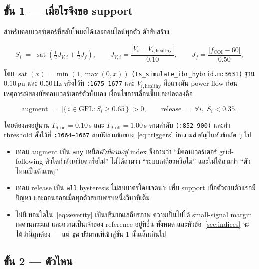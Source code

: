 \documentclass[12pt,a4paper]{article}
\theoremstyle{remark}
\newcommand{\pu}{\,\mathrm{pu}}
\newcommand{\Ssev}{S}
\newcommand{\code}[1]{\texttt{\small #1}}
\begin{document}
\subsection{ขั้น 1 --- เมื่อไรจึงขอ support}

สำหรับคอนเวอร์เตอร์ที่สลับโหมดได้และออนไลน์ทุกตัว ตัวขับสร้าง

\begin{equation}
\Ssev_i \;=\; \operatorname{sat}\!\left(\tfrac{1}{2}J_{V,i} + \tfrac{1}{2}J_f\right),
\qquad
J_{V,i} = \frac{|V_i - V_{i,\text{healthy}}|}{0.10},
\qquad
J_f = \frac{|f_{\mathrm{COI}} - 60|}{0.50},
\label{eq:severity}
\end{equation}

โดย $\operatorname{sat}(x) = \min(1,\max(0,x))$
\code{(ts\_simulate\_ibr\_hybrid.m:3631)} ฐาน $0.10\pu$ และ $0.50$\,Hz
ตรึงไว้ที่ \code{:1675--1677} และ $V_{i,\text{healthy}}$ คือแรงดัน power flow
ก่อนเหตุการณ์ของบัสคอนเวอร์เตอร์ตัวนั้นเอง เงื่อนไขการเลื่อนขึ้นและปลดลงคือ

\begin{equation}
\text{augment} \;=\; \bigl|\{\,i \in \text{GFL} : \Ssev_i \ge 0.65\,\}\bigr| > 0,
\qquad
\text{release} \;=\; \forall i,\; \Ssev_i < 0.35,
\label{eq:triggers}
\end{equation}

โดยต้องคงอยู่นาน $T_{d,\mathrm{on}} = 0.10$\,s และ $T_{d,\mathrm{off}} = 1.00$\,s
ตามลำดับ \code{(:852--900)} และค่า threshold ตั้งไว้ที่ \code{:1664--1667}
สมบัติสามข้อของ~\eqref{eq:triggers} มีความสำคัญในหัวข้อถัด ๆ ไป

\begin{itemize}
\item เทอม augment เป็น \code{any} เหนือ\emph{ตัวที่ตามอยู่} index จึงถามว่า
      ``มีคอนเวอร์เตอร์ grid-following ตัวใดกำลังเครียดหรือไม่'' ไม่ได้ถามว่า
      ``ระบบเสถียรหรือไม่'' และไม่ได้ถามว่า ``ตัวไหนเป็นต้นเหตุ''
\item เทอม release เป็น \code{all} hysteresis ไม่สมมาตรโดยเจตนา: เพิ่ม support
      เมื่อตัวตามตัวแรกมีปัญหา และถอนออกเมื่อทุกตัวสบายครบหนึ่งวินาทีเต็ม
\item ไม่มีเทอมใดใน~\eqref{eq:severity} เป็นปริมาณเสถียรภาพ ความเป็นไปได้
      small-signal margin เพดานกระแส และความเป็นเจ้าของ reference อยู่ที่อื่น
      ทั้งหมด และหัวข้อ~\ref{sec:indices} จะโต้ว่านี่ถูกต้อง --- แต่
      \emph{ชุด} ปริมาณที่เข้าสู่ขั้น 1 นั้นเล็กเกินไป
\end{itemize}

\subsection{ขั้น 2 --- ตัวไหน}
\end{document}
